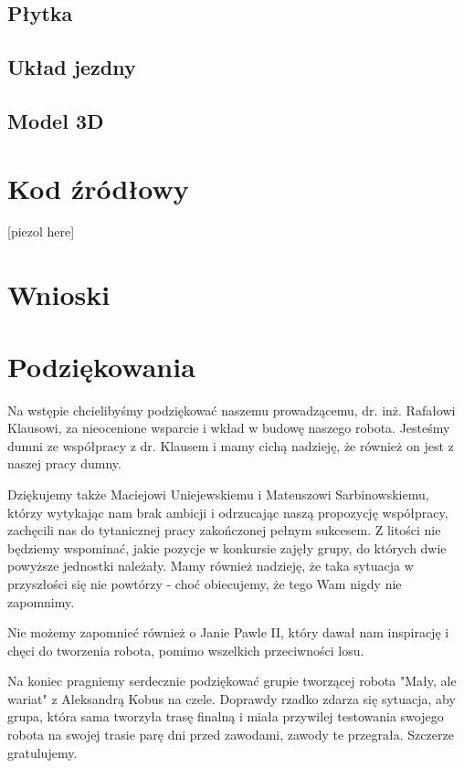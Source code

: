 \documentclass{article}
\begin{document}
\subsection{Płytka}

\subsection{Układ jezdny}

\subsection{Model 3D}

\section{Kod źródłowy}

[piezol here]

\section{Wnioski}

\section{Podziękowania}

Na wstępie chcielibyśmy podziękować naszemu prowadzącemu, dr. inż. Rafałowi Klausowi,  za nieocenione wsparcie i wkład w budowę naszego robota. Jesteśmy dumni ze współpracy z dr. Klausem i mamy cichą nadzieję, że również on jest z naszej pracy dumny.

Dziękujemy także Maciejowi Uniejewskiemu i Mateuszowi Sarbinowskiemu, którzy  wytykając nam brak ambicji i odrzucając naszą propozycję współpracy, zachęcili nas do tytanicznej pracy zakończonej pełnym sukcesem. Z litości nie będziemy wspominać, jakie pozycje w konkursie zajęły grupy, do których dwie powyższe jednostki należały. Mamy również nadzieję, że taka sytuacja w przyszłości się nie powtórzy - choć obiecujemy, że tego Wam nigdy nie zapomnimy.

Nie możemy zapomnieć również o Janie Pawle II, który dawał nam inspirację i chęci do tworzenia robota, pomimo wszelkich przeciwności losu.

Na koniec pragniemy serdecznie podziękować grupie tworzącej robota "Mały, ale wariat" z Aleksandrą Kobus na czele. Doprawdy rzadko zdarza się sytuacja, aby grupa, która sama tworzyła trasę finalną i miała przywilej testowania swojego robota na swojej trasie parę dni przed zawodami, zawody te przegrała. Szczerze gratulujemy.
\end{document}
